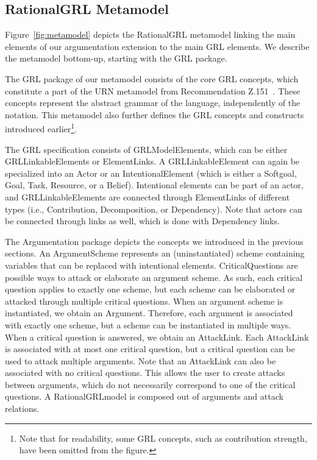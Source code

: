 \subsection{RationalGRL Metamodel}
\label{sect:metamodel}

Figure~\ref{fig:metamodel} depicts the RationalGRL metamodel linking the main elements of our argumentation extension to the main GRL elements. We describe the metamodel bottom-up, starting with the GRL package.

The GRL package of our metamodel consists of the core GRL concepts, which constitute a part of the URN metamodel from Recommendation Z.151~\cite{URN}. These concepts represent the abstract grammar of the language, independently of the notation. This metamodel also further defines the GRL concepts and constructs introduced earlier\footnote{Note that for readability, some GRL concepts, such as contribution strength, have been omitted from the figure.}.

The GRL specification consists of \textsf{GRLModelElements}, which can be either \textsf{GRLLinkableElements} or \textsf{ElementLinks}. A \textsf{GRLLinkableElement} can again be specialized into an \textsf{Actor} or an \textsf{IntentionalElement} (which is either a \textsf{Softgoal}, \textsf{Goal}, \textsf{Task}, \textsf{Resource}, or a \textsf{Belief}). Intentional elements can be part of an actor, and \textsf{GRLLinkableElements} are connected through \textsf{ElementLinks} of different types (i.e., \textsf{Contribution, Decomposition}, or \textsf{Dependency}). Note that actors can be connected through links as well, which is done with \textsf{Dependency} links. 

The Argumentation package depicts the concepts we introduced in the previous sections. An \textsf{ArgumentScheme} represents an (uninstantiated) scheme containing variables that can be replaced with intentional elements. \textsf{CriticalQuestions} are possible ways to attack or elaborate an argument scheme. As such, each critical question applies to exactly one scheme, but each scheme can be elaborated or attacked through multiple critical questions. When an argument scheme is instantiated, we obtain an \textsf{Argument}. Therefore, each argument is associated with exactly one scheme, but a scheme can be instantiated in multiple ways. When a critical question is answered, we obtain an \textsf{AttackLink}. Each \textsf{AttackLink} is associated with at most one critical question, but a critical question can be used to attack multiple arguments. Note that an \textsf{AttackLink} can also be associated with no critical questions. This allows the user to create attacks between arguments, which do not necessarily correspond to one of the critical questions. A \textsf{RationalGRLmodel} is composed out of arguments and attack relations.

